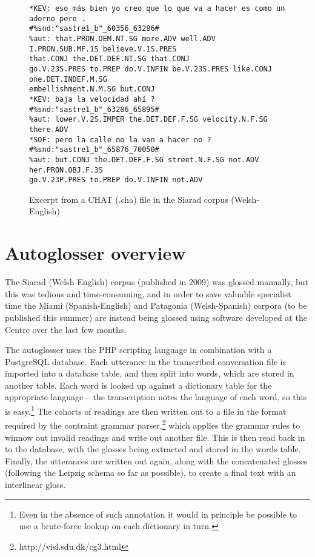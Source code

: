 \documentclass[11pt]{article}
\begin{document}
\begin{figure*} 
\begin{footnotesize}
\begin{verbatim}
*KEV: eso más bien yo creo que lo que va a hacer es como un adorno pero . 
#%snd:"sastre1_b"_60356_63286#
%aut: that.PRON.DEM.NT.SG more.ADV well.ADV I.PRON.SUB.MF.1S believe.V.1S.PRES 
that.CONJ the.DET.DEF.NT.SG that.CONJ 
go.V.23S.PRES to.PREP do.V.INFIN be.V.23S.PRES like.CONJ one.DET.INDEF.M.SG 
embellishment.N.M.SG but.CONJ
*KEV: baja la velocidad ahí ? #%snd:"sastre1_b"_63286_65895#
%aut: lower.V.2S.IMPER the.DET.DEF.F.SG velocity.N.F.SG there.ADV
*SOF: pero la calle no la van a hacer no ? #%snd:"sastre1_b"_65876_70050#
%aut: but.CONJ the.DET.DEF.F.SG street.N.F.SG not.ADV her.PRON.OBJ.F.3S 
go.V.23P.PRES to.PREP do.V.INFIN not.ADV 
\end{verbatim}
\end{footnotesize}
\caption{Excerpt from a CHAT (.cha) file in the Siarad corpus (Welsh-English)}
\label{chat_file2}
\end{figure*}

\section{Autoglosser overview}
\label{sec:autoglosser}

The Siarad (Welsh-English) corpus (published in 2009) was glossed manually, but this was tedious and time-consuming, and in order to save valuable specialist time the Miami (Spanish-English) and Patagonia (Welsh-Spanish) corpora (to be published this summer) are instead being glossed using software developed at the Centre over the last few months.

The autoglosser uses the PHP scripting language in combination with a PostgreSQL database.  Each utterance in the transcribed conversation file is imported into a database table, and then split into words, which are stored in another table.  Each word is looked up against a dictionary table for the appropriate language -- the transcription notes the language of each word, so this is easy.\footnote{Even in the absence of such annotation it would in principle be possible to use a brute-force lookup on each dictionary in turn.}  The cohorts of readings are then written out to a file in the format required by the contraint grammar parser,\footnote{http://visl.sdu.dk/cg3.html} which applies the grammar rules to winnow out invalid readings and write out another file.  This is then read back in to the database, with the glosses being extracted and stored in the words table.  Finally, the utterances are written out again, along with the concatenated glosses (following the Leipzig schema so far as possible), to create a final text with an interlinear gloss.
\end{document}
